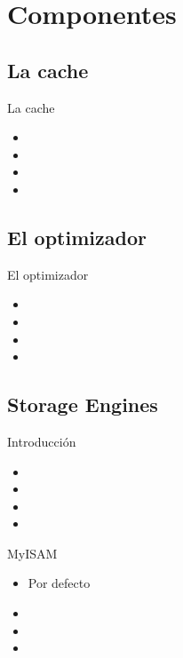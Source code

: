 \section{Componentes}
\subsection{La cache}
\begin{frame}{La cache}
  \begin{itemize}
    \item 
    \item 
    \item 
    \item 
  \end{itemize}
\end{frame}

\subsection{El optimizador}
\begin{frame}{El optimizador}
  \begin{itemize}
    \item 
    \item 
    \item 
    \item 
  \end{itemize}
\end{frame}

\subsection{Storage Engines}
\begin{frame}{Introducción}
  \begin{itemize}
    \item 
    \item 
    \item 
    \item 
  \end{itemize}
\end{frame}

\begin{frame}{MyISAM}
  \begin{itemize}
    \item Por defecto
    \item 
    \item 
    \item 
  \end{itemize}
\end{frame}

